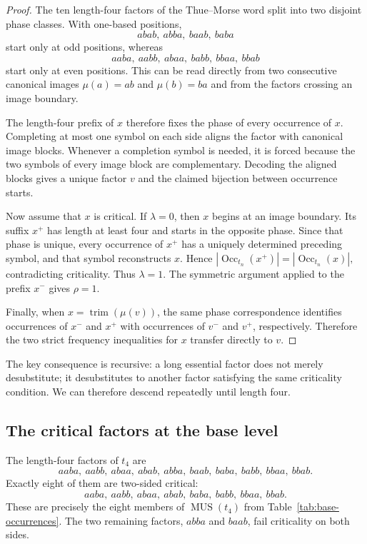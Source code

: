 \documentclass[10pt,a4paper]{article}
\theoremstyle{definition}\newtheorem{definition}[theorem]{Definition}
\theoremstyle{remark}\newtheorem{remark}[theorem]{Remark}
\newcommand{\Occ}{\operatorname{Occ}}
\newcommand{\MUS}{\operatorname{MUS}}
\begin{document}
\begin{proof}
The ten length-four factors of the Thue--Morse word split into two disjoint phase classes.  With one-based positions,
\[
 abab,\ abba,\ baab,\ baba
\]
start only at odd positions, whereas
\[
 aaba,\ aabb,\ abaa,\ babb,\ bbaa,\ bbab
\]
start only at even positions.  This can be read directly from two consecutive canonical images $\mu(a)=ab$ and $\mu(b)=ba$ and from the factors crossing an image boundary.

The length-four prefix of $x$ therefore fixes the phase of every occurrence of $x$.  Completing at most one symbol on each side aligns the factor with canonical image blocks.  Whenever a completion symbol is needed, it is forced because the two symbols of every image block are complementary.  Decoding the aligned blocks gives a unique factor $v$ and the claimed bijection between occurrence starts.

Now assume that $x$ is critical.  If $\lambda=0$, then $x$ begins at an image boundary.  Its suffix $x^+$ has length at least four and starts in the opposite phase.  Since that phase is unique, every occurrence of $x^+$ has a uniquely determined preceding symbol, and that symbol reconstructs $x$.  Hence
$
 |\Occ_{t_n}(x^+)|=|\Occ_{t_n}(x)|,
$
contradicting criticality.  Thus $\lambda=1$.  The symmetric argument applied to the prefix $x^-$ gives $\rho=1$.

Finally, when $x=\operatorname{trim}(\mu(v))$, the same phase correspondence identifies occurrences of $x^-$ and $x^+$ with occurrences of $v^-$ and $v^+$, respectively.  Therefore the two strict frequency inequalities for $x$ transfer directly to $v$.
\end{proof}

The key consequence is recursive: a long essential factor does not merely desubstitute; it desubstitutes to another factor satisfying the same criticality condition.  We can therefore descend repeatedly until length four.

\subsection{The critical factors at the base level}
\label{subsec:critical-base}

The length-four factors of $t_4$ are
\[
 aaba,\ aabb,\ abaa,\ abab,\ abba,\ baab,\ baba,\ babb,\ bbaa,\ bbab.
\]
Exactly eight of them are two-sided critical:
\[
 aaba,\ aabb,\ abaa,\ abab,\ baba,\ babb,\ bbaa,\ bbab.
\]
These are precisely the eight members of $\MUS(t_4)$ from Table~\ref{tab:base-occurrences}.  The two remaining factors, $abba$ and $baab$, fail criticality on both sides.
\end{document}
